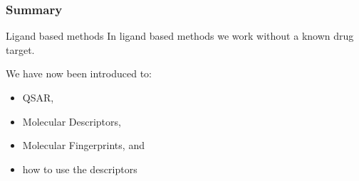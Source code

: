 \documentclass[aspectratio=169]{beamer}
\begin{document}
    \begin{frame}
        \frametitle{Summary}

        \begin{block}{Ligand based methods}
            In ligand based methods we work without a known drug target.

            \vspace{0.5\baselineskip}
            We have now been introduced to:
            \begin{itemize}
                \item QSAR,
                \item Molecular Descriptors,
                \item Molecular Fingerprints, and
                \item how to use the descriptors
            \end{itemize}
        \end{block}

    \end{frame}
\end{document}
